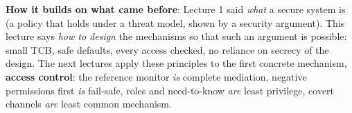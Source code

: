 \begin{recapbox}[title={Exam-ready recap --- Lecture 2: Principles}]
\textbf{How it builds on what came before}: Lecture 1 said \emph{what} a secure system is (a
policy that holds under a threat model, shown by a security argument). This lecture says
\emph{how to design} the mechanisms so that such an argument is possible: small TCB, safe
defaults, every access checked, no reliance on secrecy of the design. The next lectures apply
these principles to the first concrete mechanism, \textbf{access control}: the reference monitor
\emph{is} complete mediation, negative permissions first \emph{is} fail-safe, roles and need-to-know
\emph{are} least privilege, covert channels \emph{are} least common mechanism.
\end{recapbox}
